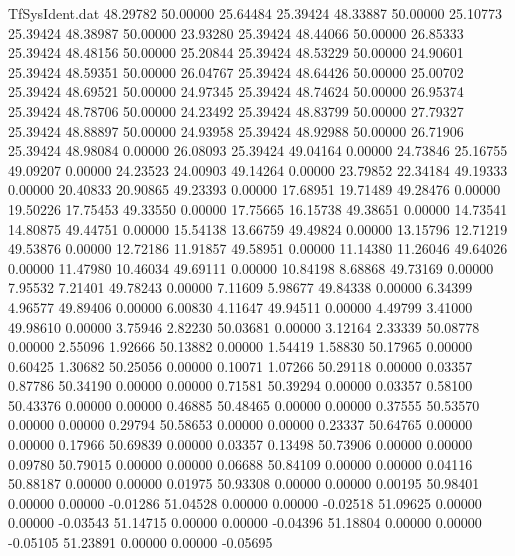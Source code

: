\begin{filecontents}{TfSysIdent.dat}
  48.29782   50.00000   25.64484   25.39424
  48.33887   50.00000   25.10773   25.39424
  48.38987   50.00000   23.93280   25.39424
  48.44066   50.00000   26.85333   25.39424
  48.48156   50.00000   25.20844   25.39424
  48.53229   50.00000   24.90601   25.39424
  48.59351   50.00000   26.04767   25.39424
  48.64426   50.00000   25.00702   25.39424
  48.69521   50.00000   24.97345   25.39424
  48.74624   50.00000   26.95374   25.39424
  48.78706   50.00000   24.23492   25.39424
  48.83799   50.00000   27.79327   25.39424
  48.88897   50.00000   24.93958   25.39424
  48.92988   50.00000   26.71906   25.39424
  48.98084    0.00000   26.08093   25.39424
  49.04164    0.00000   24.73846   25.16755
  49.09207    0.00000   24.23523   24.00903
  49.14264    0.00000   23.79852   22.34184
  49.19333    0.00000   20.40833   20.90865
  49.23393    0.00000   17.68951   19.71489
  49.28476    0.00000   19.50226   17.75453
  49.33550    0.00000   17.75665   16.15738
  49.38651    0.00000   14.73541   14.80875
  49.44751    0.00000   15.54138   13.66759
  49.49824    0.00000   13.15796   12.71219
  49.53876    0.00000   12.72186   11.91857
  49.58951    0.00000   11.14380   11.26046
  49.64026    0.00000   11.47980   10.46034
  49.69111    0.00000   10.84198    8.68868
  49.73169    0.00000    7.95532    7.21401
  49.78243    0.00000    7.11609    5.98677
  49.84338    0.00000    6.34399    4.96577
  49.89406    0.00000    6.00830    4.11647
  49.94511    0.00000    4.49799    3.41000
  49.98610    0.00000    3.75946    2.82230
  50.03681    0.00000    3.12164    2.33339
  50.08778    0.00000    2.55096    1.92666
  50.13882    0.00000    1.54419    1.58830
  50.17965    0.00000    0.60425    1.30682
  50.25056    0.00000    0.10071    1.07266
  50.29118    0.00000    0.03357    0.87786
  50.34190    0.00000    0.00000    0.71581
  50.39294    0.00000    0.03357    0.58100
  50.43376    0.00000    0.00000    0.46885
  50.48465    0.00000    0.00000    0.37555
  50.53570    0.00000    0.00000    0.29794
  50.58653    0.00000    0.00000    0.23337
  50.64765    0.00000    0.00000    0.17966
  50.69839    0.00000    0.03357    0.13498
  50.73906    0.00000    0.00000    0.09780
  50.79015    0.00000    0.00000    0.06688
  50.84109    0.00000    0.00000    0.04116
  50.88187    0.00000    0.00000    0.01975
  50.93308    0.00000    0.00000    0.00195
  50.98401    0.00000    0.00000   -0.01286
  51.04528    0.00000    0.00000   -0.02518
  51.09625    0.00000    0.00000   -0.03543
  51.14715    0.00000    0.00000   -0.04396
  51.18804    0.00000    0.00000   -0.05105
  51.23891    0.00000    0.00000   -0.05695

\end{filecontents}
